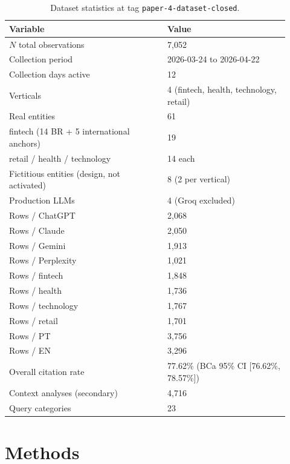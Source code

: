\documentclass[preprint,12pt,authoryear]{elsarticle}
\begin{document}
\begin{table}[htbp]
\centering
\caption{Dataset statistics at tag \texttt{paper-4-dataset-closed}.}
\label{tab:dataset}
\small
\begin{tabular}{@{}p{0.52\linewidth} p{0.4\linewidth}@{}}
\toprule
\textbf{Variable} & \textbf{Value} \\
\midrule
$N$ total observations & 7{,}052 \\
Collection period & 2026-03-24 to 2026-04-22 \\
Collection days active & 12 \\
Verticals & 4 (fintech, health, technology, retail) \\
Real entities & 61 \\
\quad fintech (14 BR + 5 international anchors) & 19 \\
\quad retail / health / technology & 14 each \\
Fictitious entities (design, not activated) & 8 (2 per vertical) \\
Production LLMs & 4 (Groq excluded) \\
Rows / ChatGPT & 2{,}068 \\
Rows / Claude & 2{,}050 \\
Rows / Gemini & 1{,}913 \\
Rows / Perplexity & 1{,}021 \\
Rows / fintech & 1{,}848 \\
Rows / health & 1{,}736 \\
Rows / technology & 1{,}767 \\
Rows / retail & 1{,}701 \\
Rows / PT & 3{,}756 \\
Rows / EN & 3{,}296 \\
Overall citation rate & 77.62\% (BCa 95\% CI [76.62\%, 78.57\%]) \\
Context analyses (secondary) & 4{,}716 \\
Query categories & 23 \\
\bottomrule
\end{tabular}
\end{table}

\section{Methods}\label{sec:methods}
\end{document}

